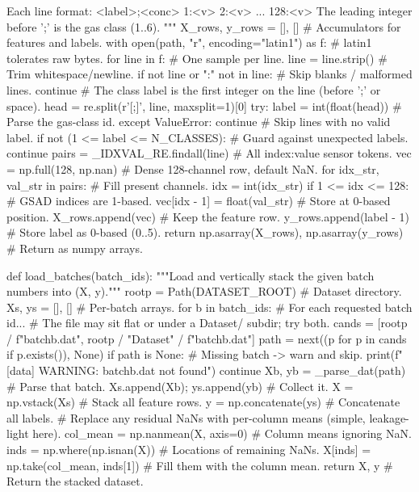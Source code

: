    Each line format: <label>;<conc> 1:<v> 2:<v> ... 128:<v>
    The leading integer before ';' is the gas class (1..6).
    """
    X_rows, y_rows = [], []                         # Accumulators for features and labels.
    with open(path, "r", encoding="latin1") as f:   # latin1 tolerates raw bytes.
        for line in f:                              # One sample per line.
            line = line.strip()                     # Trim whitespace/newline.
            if not line or ":" not in line:         # Skip blanks / malformed lines.
                continue
            # The class label is the first integer on the line (before ';' or space).
            head = re.split(r'[;\s]', line, maxsplit=1)[0]
            try:
                label = int(float(head))            # Parse the gas-class id.
            except ValueError:
                continue                            # Skip lines with no valid label.
            if not (1 <= label <= N_CLASSES):       # Guard against unexpected labels.
                continue
            pairs = _IDXVAL_RE.findall(line)        # All index:value sensor tokens.
            vec = np.full(128, np.nan)              # Dense 128-channel row, default NaN.
            for idx_str, val_str in pairs:          # Fill present channels.
                idx = int(idx_str)
                if 1 <= idx <= 128:                 # GSAD indices are 1-based.
                    vec[idx - 1] = float(val_str)   # Store at 0-based position.
            X_rows.append(vec)                      # Keep the feature row.
            y_rows.append(label - 1)                # Store label as 0-based (0..5).
    return np.asarray(X_rows), np.asarray(y_rows)   # Return as numpy arrays.

def load_batches(batch_ids):
    """Load and vertically stack the given batch numbers into (X, y)."""
    rootp = Path(DATASET_ROOT)                      # Dataset directory.
    Xs, ys = [], []                                 # Per-batch arrays.
    for b in batch_ids:                             # For each requested batch id...
        # The file may sit flat or under a Dataset/ subdir; try both.
        cands = [rootp / f"batch{b}.dat",
                 rootp / "Dataset" / f"batch{b}.dat"]
        path = next((p for p in cands if p.exists()), None)
        if path is None:                            # Missing batch -> warn and skip.
            print(f"[data] WARNING: batch{b}.dat not found")
            continue
        Xb, yb = _parse_dat(path)                   # Parse that batch.
        Xs.append(Xb); ys.append(yb)                # Collect it.
    X = np.vstack(Xs)                               # Stack all feature rows.
    y = np.concatenate(ys)                          # Concatenate all labels.
    # Replace any residual NaNs with per-column means (simple, leakage-light here).
    col_mean = np.nanmean(X, axis=0)                # Column means ignoring NaN.
    inds = np.where(np.isnan(X))                    # Locations of remaining NaNs.
    X[inds] = np.take(col_mean, inds[1])            # Fill them with the column mean.
    return X, y                                     # Return the stacked dataset.


